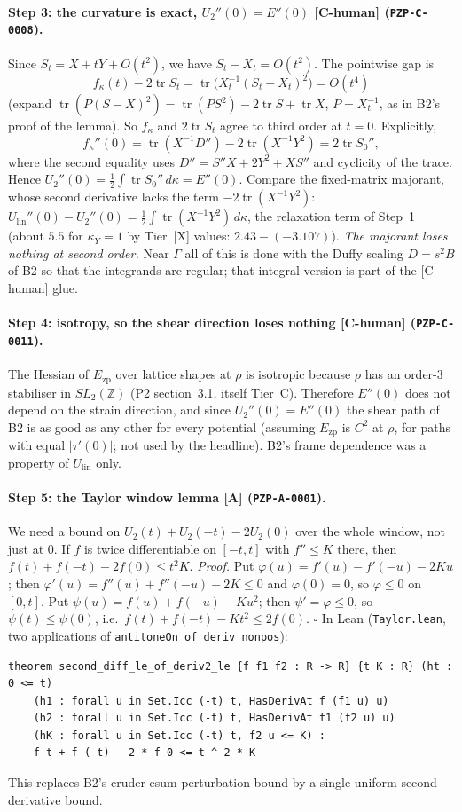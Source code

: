 \documentclass[10pt]{article}
\newcommand{\tier}[1]{\textsf{[#1]}}
\newcommand{\tA}{\tier{A}}
\newcommand{\tX}{\tier{X}}
\newcommand{\tCh}{\tier{C-human}}
\newcommand{\lean}[1]{\texttt{#1}}
\newcommand{\Ezp}{E_{\mathrm{zp}}}
\newcommand{\tr}{\operatorname{tr}}
\newcommand{\Ulin}{U_{\mathrm{lin}}}
\begin{document}
\paragraph{Step 3: the curvature is exact, $U_2''(0)=E''(0)$ \tCh{} (\texttt{PZP-C-0008}).} Since $S_t=X+tY+O(t^2)$, we have $S_t-X_t=O(t^2)$. The pointwise gap is
\[f_\kappa(t)-2\tr S_t=\tr\bigl(X_t^{-1}(S_t-X_t)^2\bigr)=O(t^4)\]
(expand $\tr(P(S-X)^2)=\tr(PS^2)-2\tr S+\tr X$, $P=X_t^{-1}$, as in B2's proof of the lemma). So $f_\kappa$ and $2\tr S_t$ agree to third order at $t=0$. Explicitly,
\[f_\kappa''(0)=\tr(X^{-1}D'')-2\tr(X^{-1}Y^2)=2\tr S_0'',\]
where the second equality uses $D''=S''X+2Y^2+XS''$ and cyclicity of the trace. Hence $U_2''(0)=\tfrac12\int\tr S_0''\,d\kappa=E''(0)$. Compare the fixed-matrix majorant, whose second derivative lacks the term $-2\tr(X^{-1}Y^2)$: $\Ulin''(0)-U_2''(0)=\tfrac12\int\tr(X^{-1}Y^2)\,d\kappa$, the relaxation term of Step~1 (about $5.5$ for $\kappa_Y=1$ by Tier~\tX{} values: $2.43-(-3.107)$). \emph{The majorant loses nothing at second order.} Near $\Gamma$ all of this is done with the Duffy scaling $D=s^2B$ of B2 so that the integrands are regular; that integral version is part of the \tCh{} glue.

\paragraph{Step 4: isotropy, so the shear direction loses nothing \tCh{} (\texttt{PZP-C-0011}).} The Hessian of $\Ezp$ over lattice shapes at $\rho$ is isotropic because $\rho$ has an order-3 stabiliser in $SL_2(\mathbb Z)$ (P2 section~3.1, itself Tier~C). Therefore $E''(0)$ does not depend on the strain direction, and since $U_2''(0)=E''(0)$ the shear path of B2 is as good as any other for every potential (assuming $\Ezp$ is $C^2$ at $\rho$, for paths with equal $|\tau'(0)|$; not used by the headline). B2's frame dependence was a property of $\Ulin$ only.

\paragraph{Step 5: the Taylor window lemma \tA{} (\texttt{PZP-A-0001}).} We need a bound on $U_2(t)+U_2(-t)-2U_2(0)$ over the whole window, not just at $0$. If $f$ is twice differentiable on $[-t,t]$ with $f''\le K$ there, then $f(t)+f(-t)-2f(0)\le t^2K$. \emph{Proof.} Put $\varphi(u)=f'(u)-f'(-u)-2Ku$; then $\varphi'(u)=f''(u)+f''(-u)-2K\le0$ and $\varphi(0)=0$, so $\varphi\le0$ on $[0,t]$. Put $\psi(u)=f(u)+f(-u)-Ku^2$; then $\psi'=\varphi\le0$, so $\psi(t)\le\psi(0)$, i.e.\ $f(t)+f(-t)-Kt^2\le2f(0)$. $\square$ In Lean (\texttt{Taylor.lean}, two applications of \lean{antitoneOn\_of\_deriv\_nonpos}):
\begin{lstlisting}
theorem second_diff_le_of_deriv2_le {f f1 f2 : R -> R} {t K : R} (ht : 0 <= t)
    (h1 : forall u in Set.Icc (-t) t, HasDerivAt f (f1 u) u)
    (h2 : forall u in Set.Icc (-t) t, HasDerivAt f1 (f2 u) u)
    (hK : forall u in Set.Icc (-t) t, f2 u <= K) :
    f t + f (-t) - 2 * f 0 <= t ^ 2 * K
\end{lstlisting}
This replaces B2's cruder esum perturbation bound by a single uniform second-derivative bound.
\end{document}
